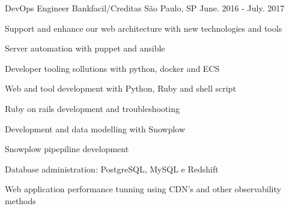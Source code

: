 \begin{cventries}
  \cventry
    {DevOps Engineer} %
    {Bankfacil/Creditas} %
    {São Paulo, SP} %
    {June. 2016 - July. 2017} %
    {
      \begin{cvitems} %
      \item {Support and enhance our web architecture with new technologies and tools}
      \item {Server automation with puppet and ansible}
      \item {Developer tooling sollutions with python, docker and ECS}
      \item {Web and tool development with Python, Ruby and shell script}
      \item {Ruby on rails development and troubleshooting}
      \item {Development and data modelling with Snowplow}
      \item {Snowplow pipepiline development}
      \item {Database administration: PostgreSQL, MySQL e Redshift}
      \item {Web application performance tunning using CDN's and other observability methods}
\end{cvitems}
    }

\end{cventries}
